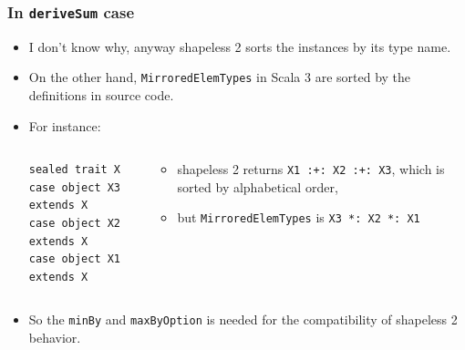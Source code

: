 \begin{frame}[fragile]
  \frametitle{ In \lstinline|deriveSum| case}

  \begin{itemize}
    \item I don't know why, anyway shapeless 2 sorts the instances by its type name\cite{shapeless2_sort}.
  
    \item On the other hand, \lstinline|MirroredElemTypes| in Scala 3 are sorted by the definitions in source code.

    \item For instance:
    \begin{columns}
      \begin{column}{0.28\textwidth}
\begin{lstlisting}[style=scala]
sealed trait X
case object X3 extends X
case object X2 extends X
case object X1 extends X
\end{lstlisting}
      \end{column}
      \begin{column}{0.57\textwidth}
        \begin{itemize}
          \item shapeless 2 returns \lstinline|X1 :+: X2 :+: X3|, which is sorted by alphabetical order,
          \item but \lstinline|MirroredElemTypes| is \lstinline|X3 *: X2 *: X1|
        \end{itemize}
      \end{column}
    \end{columns}

    \item So the \lstinline|minBy| and \lstinline|maxByOption| is needed for
    the compatibility of shapeless 2 behavior.
  \end{itemize}

\end{frame}

